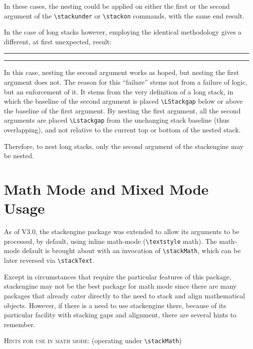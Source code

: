\documentclass{article}
\def\rl{\rule[-.3pt]{2ex}{.6pt}}
\def\ste{\textsf{stackengine}}
\let\vb\verb
\def\blmark{\rl\stackengine{-.9ex}{B}{\rule{.35ex}{0pt}L}{U}{l}{F}{T}{S}\rl}
\begin{document}
In these cases, the nesting could be applied on either the first or the
second argument of the \vb|\stackunder| or \vb|\stackon| commands,
with the same end result.

In the case of long stacks however, employing the identical methodology
gives a different, at first unexpected, result:
\def\stacktype{L}
 \blmark

In this case, nesting the second argument works as hoped, but nesting
the first argument does not.  The reason for this ``failure'' stems
not from a failure of logic, but an enforcement of it.  It stems from the
very definition of a long stack, in which the baseline of the second
argument is placed \vb|\LStackgap| below or above the baseline of the
first argument.  By nesting the first argument, all the second arguments
are placed \vb|\Lstackgap| from the unchanging stack baseline (thus
overlapping), and not relative to the current top or bottom of the
nested stack.

Therefore, to nest long stacks, only the second argument of the
stackengine may be nested.

\section{Math Mode and Mixed Mode Usage\label{s:mm}}
\def\useanchorwidth{F}
\def\stacktype{S} 

As of V3.0, the {\ste} package was extended to allow its arguments to be
processed, by default, using inline math-mode (\vb|\textstyle| math).
The math-mode default is brought about with an invocation of
\vb|\stackMath|, which can be later reversed via \vb|\stackText|.

Except in circumstances that require the particular features of this
package, {\ste} may not be the best package for math mode
since there are many packages that already cater directly to the need to
stack and align mathematical objects.  However, if there is a need to
use {\ste} there, because of its particular facility with
stacking gaps and alignment, there are several hints to remember.

\textsc{Hints for use in math mode:} (operating under \vb|\stackMath|)
\stackMath
\end{document}
